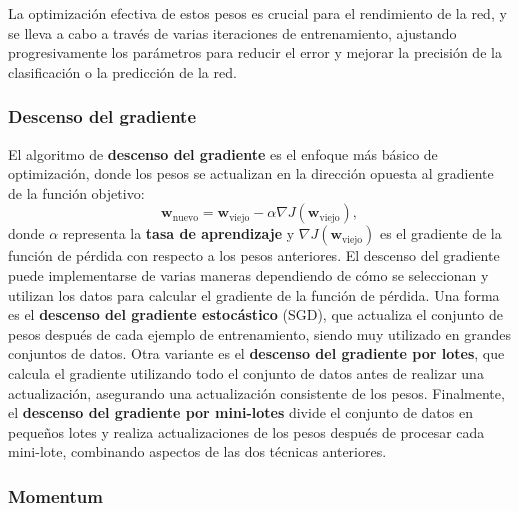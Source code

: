 La optimización efectiva de estos pesos es crucial para el rendimiento de la red, y se lleva a cabo a través de varias iteraciones de entrenamiento, ajustando progresivamente los parámetros para reducir el error y mejorar la precisión de la clasificación o la predicción de la red.

\subsubsection{Descenso del gradiente}

El algoritmo de \textbf{descenso del gradiente} \cite{cauchy1847methode} es el enfoque más básico de optimización, donde los pesos se actualizan en la dirección opuesta al gradiente de la función objetivo:
\begin{equation}
	\mathbf{w}_{\text{nuevo}} = \mathbf{w}_{\text{viejo}} - \alpha \nabla J (\mathbf{w}_{\text{viejo}}),
\end{equation}
donde \(\alpha\) representa la \textbf{tasa de aprendizaje} y \(\nabla J (\mathbf{w}_{\text{viejo}})\) es el gradiente de la función de pérdida con respecto a los pesos anteriores. El descenso del gradiente puede implementarse de varias maneras dependiendo de cómo se seleccionan y utilizan los datos para calcular el gradiente de la función de pérdida. Una forma es el \textbf{descenso del gradiente estocástico} (SGD), que actualiza el conjunto de pesos después de cada ejemplo de entrenamiento, siendo muy utilizado en grandes conjuntos de datos. Otra variante es el \textbf{descenso del gradiente por lotes}, que calcula el gradiente utilizando todo el conjunto de datos antes de realizar una actualización, asegurando una actualización consistente de los pesos. Finalmente, el \textbf{descenso del gradiente por mini-lotes} divide el conjunto de datos en pequeños lotes y realiza actualizaciones de los pesos después de procesar cada mini-lote, combinando aspectos de las dos técnicas anteriores.

\subsubsection{Momentum}

